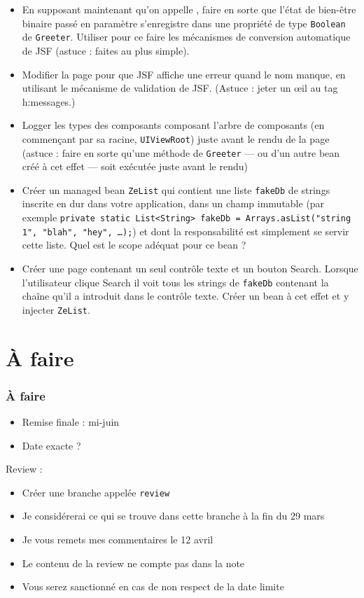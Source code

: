 \documentclass[english, french]{beamer}
\begin{document}
\begin{frame}[allowframebreaks]
\begin{itemize}
		\item En supposant maintenant qu’on appelle , faire en sorte que l’état de bien-être binaire passé en paramètre s’enregistre dans une propriété de type \texttt{Boolean} de \texttt{Greeter}. Utiliser pour ce faire les mécanismes de conversion automatique de JSF {\tiny (astuce : faites au plus simple)}.
		\item Modifier la page pour que JSF affiche une erreur quand le nom manque, en utilisant le mécanisme de validation de JSF. {\tiny (Astuce : jeter un œil au tag h:messages.)}%
		\item Logger les types des composants composant l’arbre de composants (en commençant par sa racine, \texttt{UIViewRoot}) juste avant le rendu de la page {\tiny (astuce : faire en sorte qu’une méthode de \texttt{Greeter} — ou d’un autre bean créé à cet effet — soit exécutée juste avant le rendu)}
		\item Créer un managed bean \texttt{ZeList} qui contient une liste \texttt{fakeDb} de strings inscrite en dur dans votre application, dans un champ immutable (par exemple \texttt{private static List<String> fakeDb = Arrays.asList("string 1", "blah", "hey", …);}) et dont la responsabilité est simplement se servir cette liste. Quel est le scope adéquat pour ce bean ?
		\item Créer une page  contenant un seul contrôle texte et un bouton Search. Lorsque l’utilisateur clique Search il voit tous les strings de \texttt{fakeDb} contenant la chaîne qu’il a introduit dans le contrôle texte. Créer un bean à cet effet et y injecter \texttt{ZeList}.
	\end{itemize}
\end{frame}

\section{À faire}
\begin{frame}
	\frametitle{À faire}
	
	\begin{itemize}
		\item Remise finale : mi-juin
		\item Date exacte ?
	\end{itemize}
	Review :
	\begin{itemize}
		\item Créer une branche appelée \texttt{review}
		\item Je considérerai ce qui se trouve dans cette branche à la fin du 29 mars
		\item Je vous remets mes commentaires le 12 avril
		\item Le contenu de la review ne compte pas dans la note
		\item Vous serez sanctionné en cas de non respect de la date limite
	\end{itemize}
\end{frame}
\end{document}
